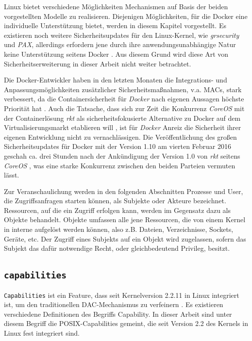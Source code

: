 \documentclass[../main.tex]{subfiles}
\begin{document}
		Linux bietet verschiedene Möglichkeiten Mechanismen auf Basis der beiden vorgestellten Modelle zu realisieren. Diejenigen Möglichkeiten, für die Docker eine individuelle Unterstützung bietet, werden in diesem Kapitel vorgestellt. Es existieren noch weitere Sicherheitsupdates für den Linux-Kernel, wie \emph{grsecurity} und \emph{PAX}, allerdings erfordern jene durch ihre anwendungsunabhängige Natur keine Unterstützung seitens Docker \cite{dockerSecurity}. Aus diesem Grund wird diese Art von Sicherheitserweiterung in dieser Arbeit nicht weiter betrachtet.

		Die Docker-Entwickler haben in den letzten Monaten die Integrations- und Anpassungsmöglichkeiten zusätzlicher Sicherheitsmaßnahmen, v.a. MACs, stark verbessert, da die Containersicherheit für \emph{Docker} nach eigenen Aussagen höchste Priorität hat \cite{githubDockerRoadmap}\cite{githubDockerChangelog}. Auch die Tatsache, dass sich zur Zeit die Konkurrenz \emph{CoreOS} mit der Containerlösung \emph{rkt} als sicherheitsfokusierte Alternative zu Docker auf dem Virtualisierungsmarkt etablieren will \cite{coreosAnnouncementRkt10}, ist für \emph{Docker} Anreiz die Sicherheit ihrer eigenen Entwicklung nicht zu vernachlässigen. Die Veröffentlichung des großen Sicherheitsupdates für Docker mit der Version 1.10 am vierten Februar 2016 geschah ca. drei Stunden nach der Ankündigung der Version 1.0 von \emph{rkt} seitens \emph{CoreOS} \cite{hnAnnouncementDocker110}\cite{hnAnnouncementRkt10}, was eine starke Konkurrenz zwischen den beiden Parteien vermuten lässt. %

		Zur Veranschaulichung werden in den folgenden Abschnitten Prozesse und User, die Zugriffsanfragen starten können, als Subjekte oder Akteure bezeichnet. Ressourcen, auf die ein Zugriff erfolgen kann, werden im Gegensatz dazu als Objekte behandelt. Objekte umfassen alle jene Ressourcen, die von einem Kernel in interne  aufgelöst werden können, also z.B. Dateien, Verzeichnisse, Sockets, Geräte, etc. Der Zugriff eines Subjekts auf ein Objekt wird zugelassen, sofern das Subjekt das dafür notwendige Recht, oder gleichbedeutend Privileg, besitzt.



    \subsection{\texttt{capabilities}}
		\label{capabilities}
			\texttt{Capabilities} ist ein Feature, dass seit Kernelversion 2.2.11 in Linux integriert ist, um den traditionellen DAC-Mechanismus zu verfeinern \cite[S.42]{SELinuxApparmor}. Es existieren verschiedene Definitionen des Begriffs \glqq{}Capability\grqq{}. In dieser Arbeit sind unter diesem Begriff die POSIX-Capabilities gemeint, die seit Version 2.2 des Kernels in Linux fest integriert sind.
\end{document}
